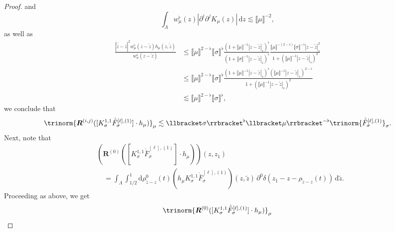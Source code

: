 \documentclass{article}
\numberwithin{equation}{section}
\newcommand{\mathd}{\mathrm{d}}
\theoremstyle{plain}
\theoremstyle{definition}
\begin{document}
\begin{proof}
  and
  \begin{equation}
    {\int_{\Lambda}}  w^{\flat}_{\mu} (z ) | \partial^i \partial^j K_{\mu} (z
    ) |\,\mathd z \lesssim \llbracket \mu \rrbracket^{- 2},
    \label{eq:bound-for-deriv-of-K}
  \end{equation}
  as well as
  \begin{align*}
      \frac{| \overline{\tilde{z}} - \bar{z} |^2 w_{\mu}^{\flat} (z -
      \tilde{z}) h_{\mu} (z, \tilde{z})}{w_{\sigma}^{\flat} (z - \tilde{z})} &
      \leqslant  \llbracket \mu \rrbracket^{2 - \flat} \llbracket \sigma
      \rrbracket^{\flat} \frac{(1 + \llbracket \mu \rrbracket^{- 1} | z -
      \tilde{z} |_s )^{\flat}}{(1 + \llbracket \sigma \rrbracket^{- 1} | z -
      \tilde{z} |_s)^{\flat}} \frac{\llbracket \mu \rrbracket^{- (2 - \flat)}
      \llbracket \sigma \rrbracket^{- \flat} | z - \tilde{z} |_s^2}{1 +
      {(\llbracket \mu \rrbracket^{- 1} | z - \tilde{z} |_s)^2} }\\
      & \leqslant  \llbracket \mu \rrbracket^{2 - \flat} \llbracket \sigma
      \rrbracket^{\flat} \frac{\left( 1 + \llbracket \mu \rrbracket^{- 1}
      | z - \tilde{z} |_s  \right)^{\flat} (\llbracket \mu
      \rrbracket^{- 1} | z - \tilde{z} |_s)^{2 - \flat}}{1 + {(\llbracket \mu
      \rrbracket^{- 1} | z - \tilde{z} |_s)^2} }\\
      & \lesssim  \llbracket \mu \rrbracket^{2 - \flat} \llbracket \sigma
      \rrbracket^{\flat},
		\label{eq:absorbing-monomials}
  \end{align*}
  we conclude that
  \[ \trinorm{ \boldsymbol{R}^{(i, j)} ([K^{1, 1}_{\sigma}
     \dot{\bar{F}}_{\sigma}^{[\ell], (1)}] \cdot h_{\mu}) }_{\mu}
     \lesssim \llbracket \sigma \rrbracket^{\flat} \llbracket \mu
     \rrbracket^{- \flat}  \trinorm{ \dot{\bar{F}}_{\sigma}^{[\ell], (1)}
     }_{\sigma} . \]
  Next, note that
  \begin{align*}
     &(\boldsymbol{R}^{(0)} ([K^{1, 1}_{\sigma}
     \dot{\bar{F}}_{\sigma}^{[\ell], (1)}] \cdot h_{\mu})) (z, z_1)\\
     &\quad = \int_{\Lambda} \int_{1 / 2}^1
     \mathd \rho_{\tilde{z} - z}^0 (t)
     (h_{\mu} K^{1, 1}_{\sigma}
     \dot{\bar{F}}_{\sigma}^{[\ell], (1)}) (z, \tilde{z})
     \,\partial^0 \delta (z_1 - z - \rho_{\tilde{z} - z} (t))
     \,\mathd \tilde{z} .
  \end{align*}
  Proceeding as above, we get
  \begin{align*}
    &\trinorm{ \boldsymbol{R}^{(0)} ([K^{1, 1}_{\sigma}
    \dot{\bar{F}}_{\sigma}^{[\ell], (1)}] \cdot h_{\mu}) }_{\mu}\\

\end{align*}
\end{proof}
\end{document}
